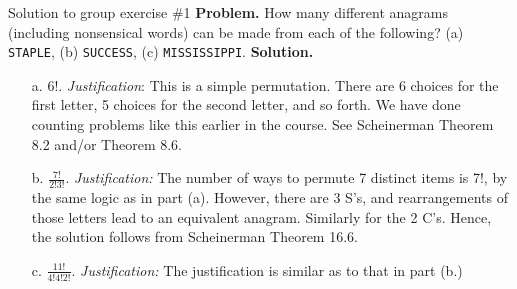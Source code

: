 \documentclass[10pt]{beamer}
\begin{document}
\begin{frame}{Solution to group exercise \#1}
\textbf{Problem.} How many different anagrams (including nonsensical words) can be made from each of the following? (a) \texttt{STAPLE}, (b)  \texttt{SUCCESS}, (c) \texttt{MISSISSIPPI}.
\vfill 
\textbf{Solution.}

\begin{itemize}
\item[a.] $6!$. \quad  \textit{Justification}:  This is a simple permutation.  There are 6 choices for the first letter, 5 choices for the second letter, and so forth. We have done counting problems like this earlier in the course.  See Scheinerman Theorem 8.2 and/or Theorem 8.6.    
\item[b.] $\frac{7!}{2!3!}$. \quad  \textit{Justification:}  The number of ways to permute 7 distinct items is 7!, by the same logic as in part (a).  However, there are 3 S's, and rearrangements of those letters lead to an equivalent anagram.  Similarly for the 2 C's.  Hence, the solution follows from Scheinerman Theorem 16.6. 
\item [c.] $\frac{11!}{4!4!2!}$.  \quad  \textit{Justification:} The justification is similar as to that in part (b.)
\end{itemize}
\end{frame}
\end{document}
